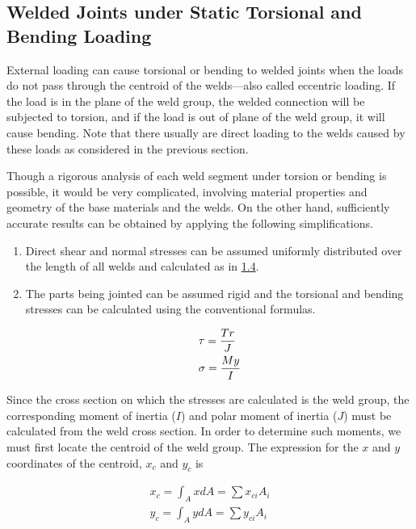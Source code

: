 \documentclass[a4paper,openany,nobib]{tufte-book}
\begin{document}
{{\subsection{Welded Joints under Static Torsional and Bending Loading}
\label{welded-joints-under-static-torsional-and-bending-loading}
External loading can cause torsional or bending to welded joints when
the loads do not pass through the centroid of the welds---also called
eccentric loading. If the load is in the plane of the weld group, the
welded connection will be subjected to torsion, and if the load is out
of plane of the weld group, it will cause bending. Note that there
usually are direct loading to the welds caused by these loads as
considered in the previous section.

Though a rigorous analysis of each weld segment under torsion or bending
is possible, it would be very complicated, involving material properties
and geometry of the base materials and the welds. On the other hand,
sufficiently accurate results can be obtained by applying the following
simplifications.

\begin{enumerate}
\item Direct shear and normal stresses can be assumed uniformly distributed
over the length of all welds and calculated as in
\hyperref[section: stress in weld under axial and shear]{1.4}.

\item The parts being jointed can be assumed rigid and the torsional and
bending stresses can be calculated using the conventional formulas.

$$\begin{gathered}
       \tau  = \frac{Tr}{J} \hfill \\
       \sigma  = \frac{My}{I} \hfill \\ 
     \end{gathered}$$
\end{enumerate}

Since the cross section on which the stresses are calculated is the weld
group, the corresponding moment of inertia (\(I\)) and polar moment of
inertia (\(J\)) must be calculated from the weld cross section. In order
to determine such moments, we must first locate the centroid of the weld
group. The expression for the \(x\) and \(y\) coordinates of the centroid,
\(x_c\) and \(y_c\) is

$$\begin{aligned}
  x_c = \int_A xdA = \sum x_{ci}A_i \\
  y_c = \int_A ydA = \sum y_{ci}A_i\end{aligned}$$

}}
\end{document}

